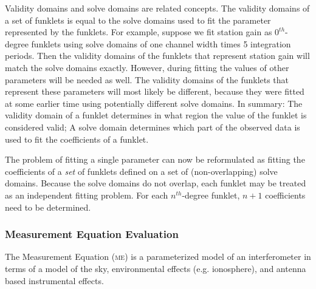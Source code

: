 \documentclass[10pt]{lofar}
\newcommand{\me}{\textsc{me}\xspace}
\begin{document}
Validity domains and solve domains are related concepts. The validity domains of
a set of funklets is equal to the solve domains used to fit the parameter
represented by the funklets. For example, suppose we fit station gain as
$0^{th}$-degree funklets using solve domains of one channel width times 5
integration periods. Then the validity domains of the funklets that represent
station gain will match the solve domains exactly. However, during fitting the
values of other parameters will be needed as well. The validity domains of the
funklets that represent these parameters will most likely be different, because
they were fitted at some earlier time using potentially different solve domains.
In summary: The validity domain of a funklet determines in what region the value
of the funklet is considered valid; A solve domain determines which part of the
observed data is used to fit the coefficients of a funklet.

The problem of fitting a single parameter can now be reformulated as fitting the
coefficients of a \emph{set} of funklets defined on a set of (non-overlapping)
solve domains. Because the solve domains do not overlap, each funklet may be
treated as an independent fitting problem. For each $n^{th}$-degree funklet,
$n+1$ coefficients need to be determined.

\subsubsection{Measurement Equation Evaluation}
\label{subsubsec:design-me-evaluation}
The Measurement Equation (\me) \cite{LOFAR-ASTRON-ADD-015} is a parameterized
model of an interferometer in terms of a model of the sky, environmental effects
(e.g. ionosphere), and antenna based instrumental effects.
\end{document}
